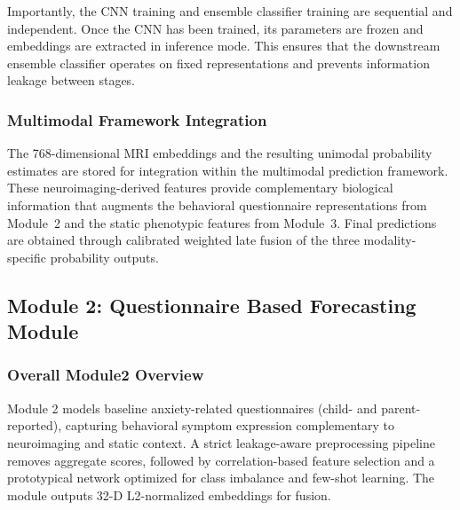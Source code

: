 \documentclass[10pt,letterpaper]{article}
\begin{document}
                                                                        Importantly, the CNN training and ensemble classifier training are sequential and independent. Once the CNN has been trained, its parameters are frozen and embeddings are extracted in inference mode. This ensures that the downstream ensemble classifier operates on fixed representations and prevents information leakage between stages.

                                                                        \subsubsection*{\textbf{Multimodal Framework Integration}}

                                                                        The 768-dimensional MRI embeddings and the resulting unimodal probability estimates are stored for integration within the multimodal prediction framework. These neuroimaging-derived features provide complementary biological information that augments the behavioral questionnaire representations from Module~2 and the static phenotypic features from Module~3. Final predictions are obtained through calibrated weighted late fusion of the three modality-specific probability outputs.

                                                                        \subsection*{Module 2: Questionnaire Based Forecasting Module}

                                                                        \subsubsection*{\textbf{Overall Module2 Overview}}
                                                                        Module 2 models baseline anxiety-related questionnaires (child- and parent-reported), capturing behavioral symptom expression complementary to neuroimaging and static context. A strict leakage-aware preprocessing pipeline removes aggregate scores, followed by correlation-based feature selection and a prototypical network optimized for class imbalance and few-shot learning. The module outputs 32-D L2-normalized embeddings for fusion. 
\end{document}
